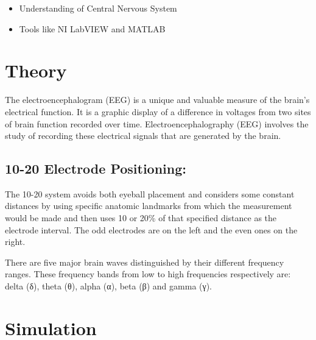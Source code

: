 \documentclass[
  11pt,
  letterpaper,
  DIV=11,
  numbers=noendperiod]{scrreprt}
\providecommand{\tightlist}{%
  \setlength{\itemsep}{0pt}\setlength{\parskip}{0pt}}\usepackage{longtable,booktabs,array}
\begin{document}
\begin{itemize}
\tightlist
\item
  Understanding of Central Nervous System
\item
  Tools like NI LabVIEW and MATLAB
\end{itemize}

\section{Theory}\label{theory-6}

The electroencephalogram (EEG) is a unique and valuable measure of the
brain's electrical function. It is a graphic display of a difference in
voltages from two sites of brain function recorded over time.
Electroencephalography (EEG) involves the study of recording these
electrical signals that are generated by the brain.

\subsection{10-20 Electrode Positioning:}\label{electrode-positioning}

The 10-20 system avoids both eyeball placement and considers some
constant distances by using specific anatomic landmarks from which the
measurement would be made and then uses 10 or 20\% of that specified
distance as the electrode interval. The odd electrodes are on the left
and the even ones on the right.

There are five major brain waves distinguished by their different
frequency ranges. These frequency bands from low to high frequencies
respectively are: delta (δ), theta (θ), alpha (α), beta (β) and gamma
(γ).

\section{Simulation}\label{simulation-1}
\end{document}
